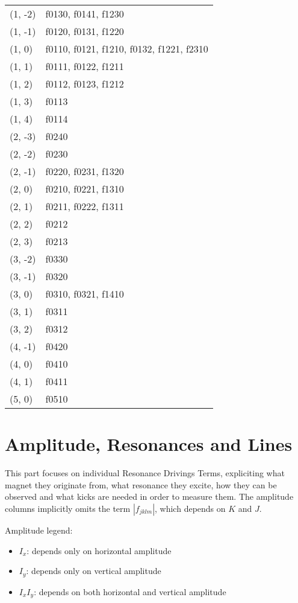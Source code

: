\begin{longtable}[]{@{}ll@{}}
(1, -2) & f0130, f0141, f1230 \\
(1, -1) & f0120, f0131, f1220 \\
(1, 0) & f0110, f0121, f1210, f0132, f1221, f2310 \\
(1, 1) & f0111, f0122, f1211 \\
(1, 2) & f0112, f0123, f1212 \\
(1, 3) & f0113 \\
(1, 4) & f0114 \\
(2, -3) & f0240 \\
(2, -2) & f0230 \\
(2, -1) & f0220, f0231, f1320 \\
(2, 0) & f0210, f0221, f1310 \\
(2, 1) & f0211, f0222, f1311 \\
(2, 2) & f0212 \\
(2, 3) & f0213 \\
(3, -2) & f0330 \\
(3, -1) & f0320 \\
(3, 0) & f0310, f0321, f1410 \\
(3, 1) & f0311 \\
(3, 2) & f0312 \\
(4, -1) & f0420 \\
(4, 0) & f0410 \\
(4, 1) & f0411 \\
(5, 0) & f0510 \\
\bottomrule()
\end{longtable}

\newpage

\section{Amplitude, Resonances and Lines}

This part focuses on individual Resonance Drivings Terms, expliciting what magnet they originate from, what resonance they excite, how they can be observed and what kicks are needed in order to measure them.
The amplitude columns implicitly omits the term $|f_{jklm}|$, which depends on $K$ and $J$.

Amplitude legend:

\begin{itemize}
\tightlist
\item
  \colorbox{orange!20}{$I_x$}: depends only on horizontal amplitude
\item
  \colorbox{red!20}{$I_y$}: depends only on vertical amplitude
\item
  \colorbox{blue!20}{$I_x I_y$}: depends on both horizontal and vertical
  amplitude
\end{itemize}


